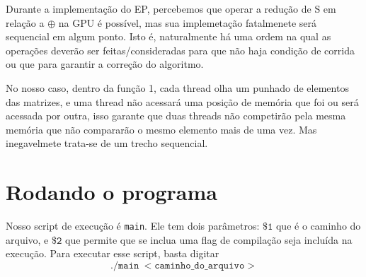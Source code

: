 \documentclass[11pt]{article}
\begin{document}
Durante a implementação do EP, percebemos que operar a redução de S em relação a $\oplus$ na GPU é possível, mas sua implemetação fatalmenete será sequencial em algum ponto. Isto é, naturalmente há uma ordem na qual as operações deverão ser feitas/consideradas para que não haja condição de corrida ou que para garantir a correção do algoritmo.

No nosso caso, dentro da função 1, cada thread olha um punhado de elementos das matrizes, e uma thread não acessará uma posição de memória que foi ou será acessada por outra, isso garante que duas threads não competirão pela mesma memória que não compararão o mesmo elemento mais de uma vez. Mas inegavelmete trata-se de um trecho sequencial.

\section{Rodando o programa}

Nosso script de execução é \texttt{main}. Ele tem dois parâmetros: $\mathtt{\$1}$ que é o caminho do arquivo, e $\mathtt{\$2}$ que permite que se inclua uma flag de compilação seja incluída na execução. Para executar esse script, basta digitar $$ \mathtt{./main \ <caminho\_do\_arquivo>} $$
\end{document}
